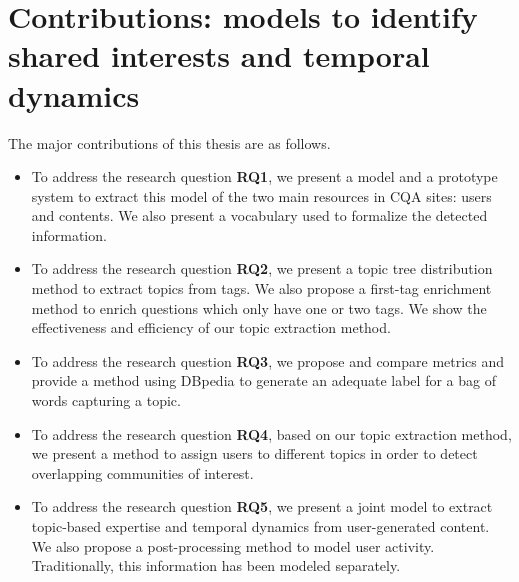 \section{Contributions: models to identify shared interests and temporal dynamics}
The major contributions of this thesis are as follows.
\begin{itemize}
\item{To address the research question \textbf{RQ1}, we present a model and a prototype system to extract this model of the two main resources in CQA sites: users and contents. We also present a vocabulary used to formalize the detected information.}

\item{To address the research question \textbf{RQ2}, we present a topic tree distribution method to extract topics from tags. We also propose a first-tag enrichment method to enrich questions which only have one or two tags. We show the effectiveness and efficiency of our topic extraction method.}

\item{To address the research question \textbf{RQ3}, we propose and compare metrics and provide a method using DBpedia to generate an adequate label for a bag of words capturing a topic.}

\item{To address the research question \textbf{RQ4}, based on our topic extraction method, we present a method to assign users to different topics in order to detect overlapping communities of interest.}

\item{To address the research question \textbf{RQ5}, we present a joint model to extract topic-based expertise and temporal dynamics from user-generated content. We also propose a post-processing method to model user activity. Traditionally, this information has been modeled separately.}

\end{itemize}




